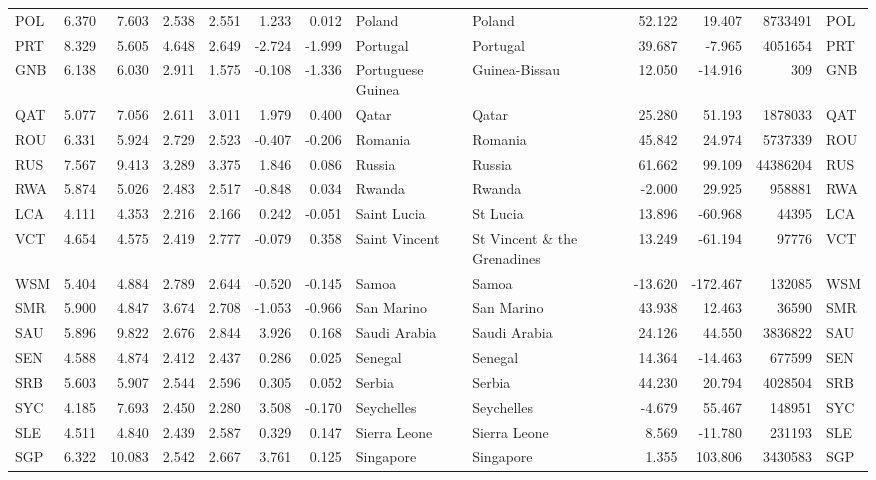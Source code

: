 \begin{tabular}{lrrrrrrllrrrl}
POL & 6.370 & 7.603 & 2.538 & 2.551 & 1.233 & 0.012 & Poland & Poland & 52.122 & 19.407 & 8733491 & POL \\
PRT & 8.329 & 5.605 & 4.648 & 2.649 & -2.724 & -1.999 & Portugal & Portugal & 39.687 & -7.965 & 4051654 & PRT \\
GNB & 6.138 & 6.030 & 2.911 & 1.575 & -0.108 & -1.336 & Portuguese Guinea & Guinea-Bissau & 12.050 & -14.916 & 309 & GNB \\
QAT & 5.077 & 7.056 & 2.611 & 3.011 & 1.979 & 0.400 & Qatar & Qatar & 25.280 & 51.193 & 1878033 & QAT \\
ROU & 6.331 & 5.924 & 2.729 & 2.523 & -0.407 & -0.206 & Romania & Romania & 45.842 & 24.974 & 5737339 & ROU \\
RUS & 7.567 & 9.413 & 3.289 & 3.375 & 1.846 & 0.086 & Russia & Russia & 61.662 & 99.109 & 44386204 & RUS \\
RWA & 5.874 & 5.026 & 2.483 & 2.517 & -0.848 & 0.034 & Rwanda & Rwanda & -2.000 & 29.925 & 958881 & RWA \\
LCA & 4.111 & 4.353 & 2.216 & 2.166 & 0.242 & -0.051 & Saint Lucia & St Lucia & 13.896 & -60.968 & 44395 & LCA \\
VCT & 4.654 & 4.575 & 2.419 & 2.777 & -0.079 & 0.358 & Saint Vincent & St Vincent \& the Grenadines & 13.249 & -61.194 & 97776 & VCT \\
WSM & 5.404 & 4.884 & 2.789 & 2.644 & -0.520 & -0.145 & Samoa & Samoa & -13.620 & -172.467 & 132085 & WSM \\
SMR & 5.900 & 4.847 & 3.674 & 2.708 & -1.053 & -0.966 & San Marino & San Marino & 43.938 & 12.463 & 36590 & SMR \\
SAU & 5.896 & 9.822 & 2.676 & 2.844 & 3.926 & 0.168 & Saudi Arabia & Saudi Arabia & 24.126 & 44.550 & 3836822 & SAU \\
SEN & 4.588 & 4.874 & 2.412 & 2.437 & 0.286 & 0.025 & Senegal & Senegal & 14.364 & -14.463 & 677599 & SEN \\
SRB & 5.603 & 5.907 & 2.544 & 2.596 & 0.305 & 0.052 & Serbia & Serbia & 44.230 & 20.794 & 4028504 & SRB \\
SYC & 4.185 & 7.693 & 2.450 & 2.280 & 3.508 & -0.170 & Seychelles & Seychelles & -4.679 & 55.467 & 148951 & SYC \\
SLE & 4.511 & 4.840 & 2.439 & 2.587 & 0.329 & 0.147 & Sierra Leone & Sierra Leone & 8.569 & -11.780 & 231193 & SLE \\
SGP & 6.322 & 10.083 & 2.542 & 2.667 & 3.761 & 0.125 & Singapore & Singapore & 1.355 & 103.806 & 3430583 & SGP \\

\end{tabular}
